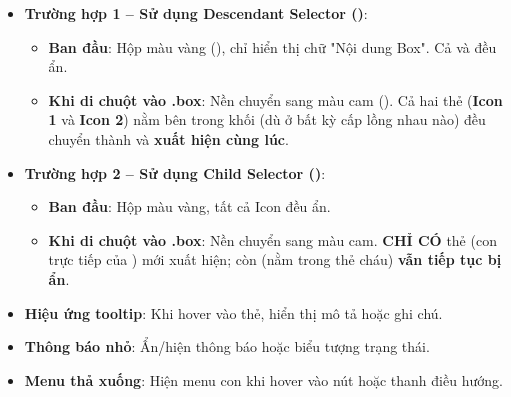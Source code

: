 \begin{browserWindow}
\begin{itemize}[leftmargin=1.5em, itemsep=4pt, parsep=0pt]
    \item \textbf{Trường hợp 1 -- Sử dụng Descendant Selector ()}:
    \begin{itemize}[leftmargin=1.2em, itemsep=2pt]
        \item \textbf{Ban đầu}: Hộp màu vàng (), chỉ hiển thị chữ "Nội dung Box". Cả  và  đều ẩn.
        \item \textbf{Khi di chuột vào .box}: Nền chuyển sang màu cam (). Cả hai thẻ  (\textbf{Icon 1} và \textbf{Icon 2}) nằm bên trong khối  (dù ở bất kỳ cấp lồng nhau nào) đều chuyển thành  và \textbf{xuất hiện cùng lúc}.
    \end{itemize}
    \par\vspace{4pt}
    \item \textbf{Trường hợp 2 -- Sử dụng Child Selector ()}:
    \begin{itemize}[leftmargin=1.2em, itemsep=2pt]
        \item \textbf{Ban đầu}: Hộp màu vàng, tất cả Icon đều ẩn.
        \item \textbf{Khi di chuột vào .box}: Nền chuyển sang màu cam. \textbf{CHỈ CÓ} thẻ  (con trực tiếp của ) mới xuất hiện; còn  (nằm trong thẻ  cháu) \textbf{vẫn tiếp tục bị ẩn}.
    \end{itemize}
\end{itemize}
\end{browserWindow}

\begin{tipBox}
\begin{itemize}[leftmargin=1.5em, itemsep=2pt, parsep=0pt]
    \item \textbf{Hiệu ứng tooltip}: Khi hover vào thẻ, hiển thị mô tả hoặc ghi chú.
    \item \textbf{Thông báo nhỏ}: Ẩn/hiện thông báo hoặc biểu tượng trạng thái.
    \item \textbf{Menu thả xuống}: Hiện menu con khi hover vào nút hoặc thanh điều hướng.
\end{itemize}
\end{tipBox}

